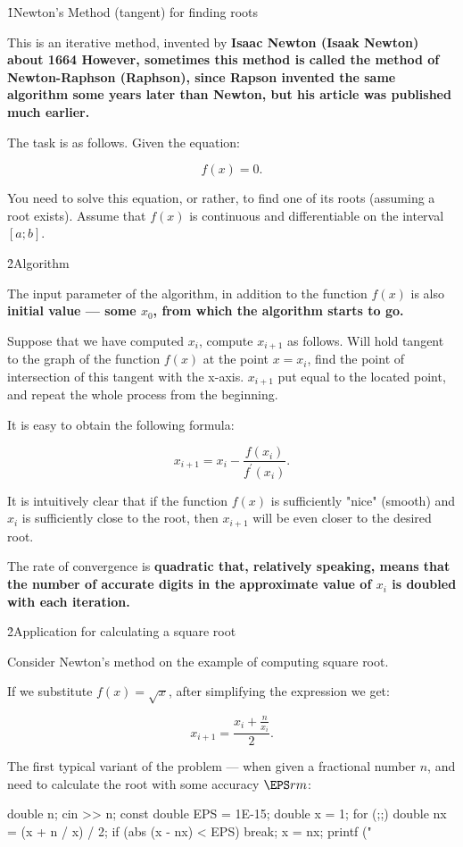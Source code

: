 \h1{Newton's Method (tangent) for finding roots}

This is an iterative method, invented by \bf{Isaac Newton} (Isaak Newton) about 1664 However, sometimes this method is called the method of Newton-Raphson (Raphson), since Rapson invented the same algorithm some years later than Newton, but his article was published much earlier.

The task is as follows. Given the equation:

$$ f(x) = 0. $$

You need to solve this equation, or rather, to find one of its roots (assuming a root exists). Assume that $f(x)$ is continuous and differentiable on the interval $[a;b]$.


\h2{Algorithm}

The input parameter of the algorithm, in addition to the function $f(x)$ is also \bf{initial value} --- some $x_0$, from which the algorithm starts to go.

Suppose that we have computed $x_i$, compute $x_{i+1}$ as follows. Will hold tangent to the graph of the function $f(x)$ at the point $x = x_i$, find the point of intersection of this tangent with the x-axis. $x_{i+1}$ put equal to the located point, and repeat the whole process from the beginning.

It is easy to obtain the following formula:

$$ x_{i+1} = x_i - \frac{ f(x_i) }{ f^\prime(x_i) }. $$

It is intuitively clear that if the function $f(x)$ is sufficiently "nice" (smooth) and $x_i$ is sufficiently close to the root, then $x_{i+1}$ will be even closer to the desired root.

The rate of convergence is \bf{quadratic} that, relatively speaking, means that the number of accurate digits in the approximate value of $x_i$ is doubled with each iteration.


\h2{Application for calculating a square root}

Consider Newton's method on the example of computing square root.

If we substitute $f(x) = \sqrt{x}$, after simplifying the expression we get:

$$ x_{i+1} = \frac{ x_i + \frac{n}{x_i} }{ 2 }. $$

The first typical variant of the problem --- when given a fractional number $n$, and need to calculate the root with some accuracy $\EPS rm$:

\code
double n;
cin >> n;
const double EPS = 1E-15;
double x = 1;
for (;;) {
double nx = (x + n / x) / 2;
if (abs (x - nx) < EPS) break;
x = nx;
}
printf ("%
\endcode

